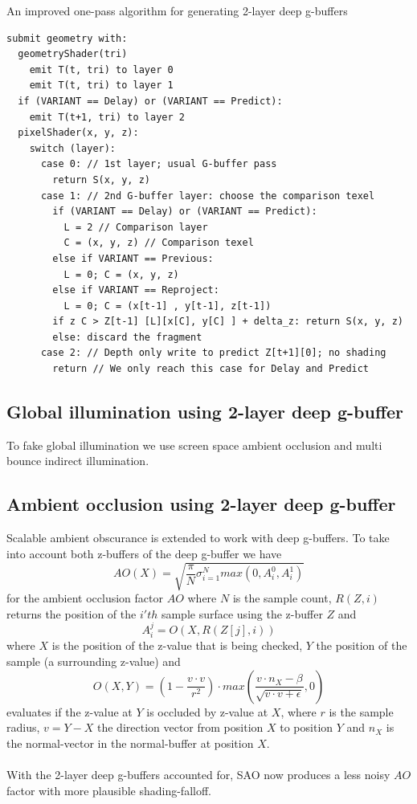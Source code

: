 \documentclass{ACGSeminar}
\begin{document}
		\begin{algorithm} \label{alg:one_pass_strawman} \caption{An improved one-pass algorithm for generating 2-layer deep g-buffers}
		\begin{lstlisting}[frame=single]
submit geometry with:
  geometryShader(tri)
    emit T(t, tri) to layer 0
    emit T(t, tri) to layer 1
  if (VARIANT == Delay) or (VARIANT == Predict):
    emit T(t+1, tri) to layer 2
  pixelShader(x, y, z):
    switch (layer):
      case 0: // 1st layer; usual G-buffer pass
        return S(x, y, z)
      case 1: // 2nd G-buffer layer: choose the comparison texel
        if (VARIANT == Delay) or (VARIANT == Predict):
          L = 2 // Comparison layer
          C = (x, y, z) // Comparison texel
        else if VARIANT == Previous:
          L = 0; C = (x, y, z)
        else if VARIANT == Reproject:
          L = 0; C = (x[t-1] , y[t-1], z[t-1])
        if z C > Z[t-1] [L][x[C], y[C] ] + delta_z: return S(x, y, z)
        else: discard the fragment
      case 2: // Depth only write to predict Z[t+1][0]; no shading
        return // We only reach this case for Delay and Predict
		\end{lstlisting}
		\end{algorithm}
	\subsection{Global illumination using 2-layer deep g-buffer} 
		To fake global illumination we use screen space ambient occlusion and multi bounce indirect illumination. \cite{RAD} \cite{RSM} \cite{TSTMT}
	\subsection{Ambient occlusion using 2-layer deep g-buffer}
		Scalable ambient obscurance \cite{SAO} is extended to work with deep g-buffers. To take into account both z-buffers of the deep g-buffer we have
		$$ AO(X) = \sqrt{\frac{\pi}{N} \sigma_{i=1}^{N} max(0, A_{i}^{0}, A_{i}^{1})} $$
		for the ambient occlusion factor $AO$ where $N$ is the sample count, $R(Z, i)$ returns the position of the $i'th$ sample surface using the z-buffer $Z$ and
		$$ A_{i}^{j} = O(X, R(Z[j], i))$$
		where $X$ is the position of the z-value that is being checked, $Y$ the position of the sample (a surrounding z-value) and
		$$ O(X, Y) = (1 - \frac{v \cdot v}{r^2}) \cdot max(\frac{v \cdot n_X - \beta}{\sqrt{v \cdot v + \epsilon}}, 0) $$
		evaluates if the z-value at $Y$ is occluded by z-value at $X$, where $r$ is the sample radius, $v = Y - X$ the direction vector from position $X$ to position $Y$ and $n_X$ is the normal-vector in the normal-buffer at position $X$. \\\\
		With the 2-layer deep g-buffers accounted for, SAO now produces a less noisy $AO$ factor with more plausible shading-falloff. 
\end{document}
